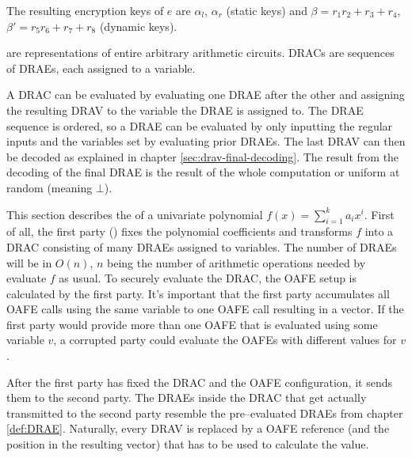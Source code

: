 \noindent{}The resulting encryption keys of $e$ are $\alpha_l$, $\alpha_r$
(static keys) and $\beta = r_1r_2 + r_3 + r_4$, $\beta' = r_5r_6 + r_7 + r_8$
(dynamic keys).



%
%
\label{sec:drac}

 are representations of entire
arbitrary arithmetic circuits. DRACs are sequences of DRAEs, each assigned to a
variable.

\label{sec:DRAC-eval}

A DRAC can be evaluated by evaluating one DRAE after the other and assigning the
resulting DRAV to the variable the DRAE is assigned to. The DRAE sequence is
ordered, so a DRAE can be evaluated by only inputting the regular inputs
and the variables set by evaluating prior DRAEs. The last DRAV can then be
decoded as explained in chapter \ref{sec:drav-final-decoding}. The result from
the decoding of the final DRAE is the result of the whole computation or uniform
at random (meaning $\bot$).


%
%
\label{sec:OPE}

This section describes the  of a
univariate polynomial $f(x) = \sum_{i=1}^k a_ix^i$. First of all, the first
party (\JWpOne{}) fixes the polynomial coefficients and transforms $f$ into a
DRAC consisting of many DRAEs assigned to variables. The number of DRAEs will be
in $O(n)$, $n$ being the number of arithmetic operations needed by evaluate
$f$ as usual. To securely evaluate the DRAC, the OAFE setup is calculated by
the first party. It's important that the first party accumulates all OAFE calls
using the same variable to one OAFE call resulting in a vector. If the first
party would provide more than one OAFE that is evaluated using some variable
$v$, a corrupted party could evaluate the OAFEs with different values for $v$.

After the first party has fixed the DRAC and the OAFE configuration, it sends
them to the second party. The DRAEs inside the DRAC that get actually
transmitted to the second party resemble the pre--evaluated DRAEs from chapter
\ref{def:DRAE}. Naturally, every DRAV is replaced by a OAFE reference (and the
position in the resulting vector) that has to be used to calculate the value.

